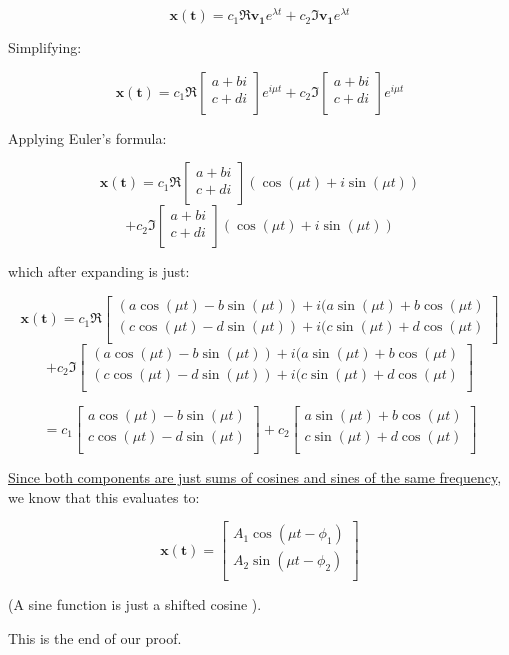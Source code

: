 \documentclass{report}
\begin{document}
$$\mathbf{x(t)} = c_1\Re{\mathbf{v_1}e^{\lambda t}} + c_2\Im{\mathbf{v_1}e^{\lambda t}}$$

Simplifying:

$$\mathbf{x(t)} = c_1\Re{\begin{bmatrix}
    a + bi \\
    c + di \\
\end{bmatrix}
e^{i\mu t}} + c_2\Im{\begin{bmatrix}
    a + bi \\
    c + di \\
\end{bmatrix}
e^{i\mu t}}$$

Applying Euler's formula:

$$\mathbf{x(t)} = c_1\Re{\begin{bmatrix}
    a + bi \\
    c + di \\
\end{bmatrix}
(\cos(\mu t) + i\sin(\mu t))}
$$
$$+ c_2\Im{\begin{bmatrix}
    a + bi \\
    c + di \\
\end{bmatrix}
(\cos(\mu t) + i\sin(\mu t))}$$

which after expanding is just:

$$\mathbf{x(t)} = c_1\Re{
\begin{bmatrix}
    (a\cos(\mu t) - b\sin(\mu t)) + i(a\sin(\mu t) + b\cos(\mu t) \\
    (c\cos(\mu t) - d\sin(\mu t)) + i(c\sin(\mu t) + d\cos(\mu t) \\
\end{bmatrix}}
$$
$$+ c_2\Im{
\begin{bmatrix}
    (a\cos(\mu t) - b\sin(\mu t)) + i(a\sin(\mu t) + b\cos(\mu t) \\
    (c\cos(\mu t) - d\sin(\mu t)) + i(c\sin(\mu t) + d\cos(\mu t) \\
\end{bmatrix}}
$$

$$= c_1
\begin{bmatrix}
    a\cos(\mu t) - b\sin(\mu t) \\
    c\cos(\mu t) - d\sin(\mu t) \\
\end{bmatrix}
+ c_2
\begin{bmatrix}
    a\sin(\mu t) + b\cos(\mu t) \\
    c\sin(\mu t) + d\cos(\mu t) \\
\end{bmatrix}
$$

\hyperref[th:sinPlusCosin]{Since both components are just sums of cosines and sines of the same frequency}, we know that this evaluates to:

$$
\mathbf{x(t)} = 
\begin{bmatrix}
    A_1\cos(\mu t - \phi_1) \\ 
    A_2\sin(\mu t - \phi_2) \\
\end{bmatrix}
$$

(A sine function is just a shifted cosine ).

This is the end of our proof.
\end{document}
